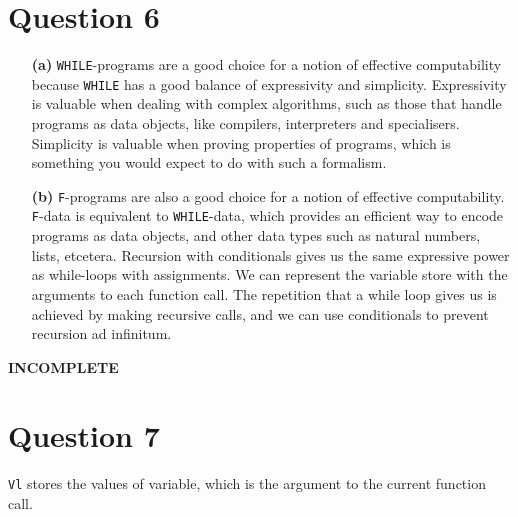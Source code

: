 \documentclass{article}
\begin{document}
\section*{Question 6}
\begin{enumerate}
    \item[\textbf{(a)}] \texttt{WHILE}-programs are a good choice for a notion of effective computability because \texttt{WHILE} has a good balance of expressivity and simplicity. Expressivity is valuable when dealing with complex algorithms, such as those that handle programs as data objects, like compilers, interpreters and specialisers. Simplicity is valuable when proving properties of programs, which is something you would expect to do with such a formalism.
    \item[\textbf{(b)}] \texttt{F}-programs are also a good choice for a notion of effective computability. \texttt{F}-data is equivalent to \texttt{WHILE}-data, which provides an efficient way to encode programs as data objects, and other data types such as natural numbers, lists, etcetera. Recursion with conditionals gives us the same expressive power as while-loops with assignments. We can represent the variable store with the arguments to each function call. The repetition that a while loop gives us is achieved by making recursive calls, and we can use conditionals to prevent recursion ad infinitum.
\end{enumerate}

\textbf{INCOMPLETE}

\section*{Question 7}
\texttt{Vl} stores the values of variable, which is the argument to the current function call.
\end{document}
